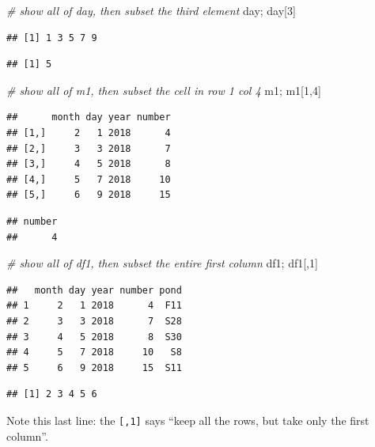 \documentclass[]{book}
\newenvironment{Shaded}{\begin{snugshade}}{\end{snugshade}}
\newcommand{\CommentTok}[1]{\textcolor[rgb]{0.56,0.35,0.01}{\textit{#1}}}
\newcommand{\DecValTok}[1]{\textcolor[rgb]{0.00,0.00,0.81}{#1}}
\newcommand{\NormalTok}[1]{#1}
\begin{document}
\begin{Shaded}
\begin{Highlighting}[]
\CommentTok{# show all of day, then subset the third element}
\NormalTok{day; day[}\DecValTok{3}\NormalTok{]}
\end{Highlighting}
\end{Shaded}

\begin{verbatim}
## [1] 1 3 5 7 9
\end{verbatim}

\begin{verbatim}
## [1] 5
\end{verbatim}

\begin{Shaded}
\begin{Highlighting}[]
\CommentTok{# show all of m1, then subset the cell in row 1 col 4 }
\NormalTok{m1; m1[}\DecValTok{1}\NormalTok{,}\DecValTok{4}\NormalTok{]}
\end{Highlighting}
\end{Shaded}

\begin{verbatim}
##      month day year number
## [1,]     2   1 2018      4
## [2,]     3   3 2018      7
## [3,]     4   5 2018      8
## [4,]     5   7 2018     10
## [5,]     6   9 2018     15
\end{verbatim}

\begin{verbatim}
## number 
##      4
\end{verbatim}

\begin{Shaded}
\begin{Highlighting}[]
\CommentTok{# show all of df1, then subset the entire first column}
\NormalTok{df1; df1[,}\DecValTok{1}\NormalTok{]}
\end{Highlighting}
\end{Shaded}

\begin{verbatim}
##   month day year number pond
## 1     2   1 2018      4  F11
## 2     3   3 2018      7  S28
## 3     4   5 2018      8  S30
## 4     5   7 2018     10   S8
## 5     6   9 2018     15  S11
\end{verbatim}

\begin{verbatim}
## [1] 2 3 4 5 6
\end{verbatim}

Note this last line: the \texttt{{[},1{]}} says ``keep all the rows, but take only the first column''.
\end{document}
